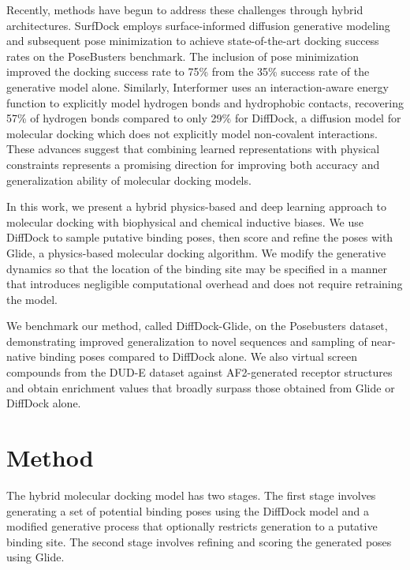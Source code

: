 \documentclass[letterpaper]{article}
\begin{document}
Recently, methods have begun to address these challenges through hybrid architectures. SurfDock employs surface-informed diffusion generative modeling and subsequent pose minimization to achieve state-of-the-art docking success rates on the PoseBusters benchmark.\cite{cao2025surfdock} The inclusion of pose minimization improved the docking success rate to 75\% from the 35\% success rate of the generative model alone. Similarly, Interformer uses an interaction-aware energy function to explicitly model hydrogen bonds and hydrophobic contacts, recovering 57\% of hydrogen bonds compared to only 29\% for DiffDock, a diffusion model for molecular docking which does not explicitly model non-covalent interactions.\cite{lai2024interformer,corso2022diffdock} These advances suggest that combining learned representations with physical constraints represents a promising direction for improving both accuracy and generalization ability of molecular docking models.

In this work, we present a hybrid physics-based and deep learning approach to molecular docking with biophysical and chemical inductive biases. We use DiffDock\cite{corso2022diffdock} to sample putative binding poses, then score and refine the poses with Glide\cite{friesner2004glide}, a physics-based molecular docking algorithm. We modify the generative dynamics so that the location of the binding site may be specified in a manner that introduces negligible computational overhead and does not require retraining the model.

We benchmark our method, called DiffDock-Glide, on the Posebusters dataset, demonstrating improved generalization to novel sequences and sampling of near-native binding poses compared to DiffDock alone. We also virtual screen compounds from the DUD-E\cite{mysinger2012dude} dataset against AF2-generated receptor structures and obtain enrichment values that broadly surpass those obtained from Glide or DiffDock alone.

\section{Method}


The hybrid molecular docking model has two stages. The first stage involves generating a set of potential binding poses using the DiffDock model and a modified generative process that optionally restricts generation to a putative binding site. The second stage involves refining and scoring the generated poses using Glide. 
\end{document}
